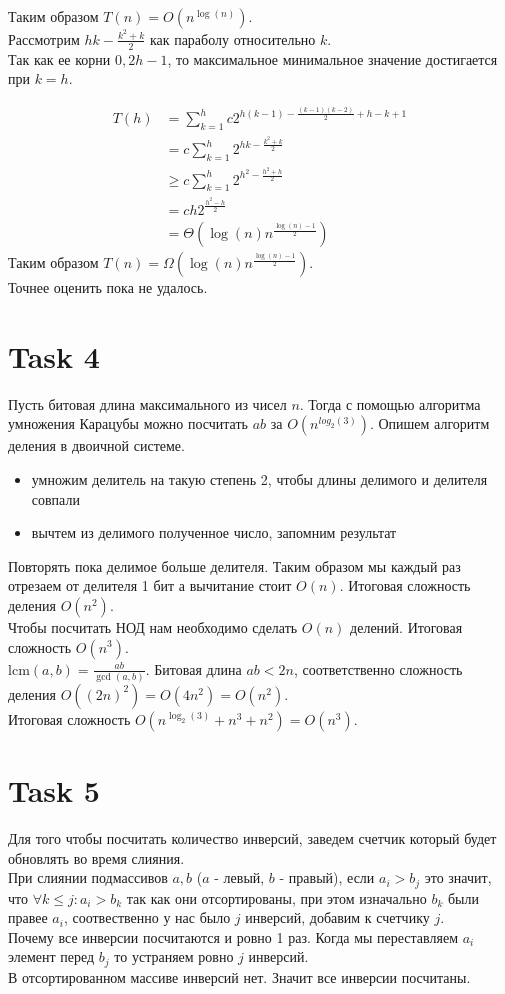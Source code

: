 \documentclass[12pt]{exam}
\begin{document}
Таким образом $T(n) = O(n^{\log(n)})$. \\
Рассмотрим $hk - \frac{k^2 + k}{2}$ как параболу относительно $k$. \\
Так как ее корни $0, 2h -1$, то максимальное минимальное значение достигается при $k=h$.

\begin{align*}
    T(h) &= \sum_{k = 1}^h c 2 ^ {h(k - 1) - \frac{(k - 1)(k - 2)}{2} + h - k + 1}  \\
         &= c \sum_{k = 1}^h 2 ^ {hk - \frac{k^2 + k}{2}} \\
         &\geq c \sum_{k = 1}^h 2 ^ {h^2 - \frac{h^2 + h}{2}} \\
         &= c h 2^{\frac{h^2 - h}{2}} \\
         &= \Theta(\log(n) n ^ {\frac{\log(n) - 1}{2}})
\end{align*}
Таким образом $T(n) = \Omega(\log(n) n ^ {\frac{\log(n) - 1}{2}})$. \\
Точнее оценить пока не удалось.

\section*{Task 4}
Пусть битовая длина максимального из чисел $n$. 
Тогда с помощью алгоритма умножения Карацубы можно посчитать $ab$ за $O(n^{log_2(3)})$.
Опишем алгоритм деления в двоичной системе.
\begin{itemize}
    \item умножим делитель на такую степень 2, чтобы длины делимого и делителя совпали
    \item вычтем из делимого полученное число, запомним результат
\end{itemize}
Повторять пока делимое больше делителя. Таким образом мы каждый раз отрезаем от делителя 1 бит а вычитание стоит $O(n)$. 
Итоговая сложность деления $O(n^2)$. \\
Чтобы посчитать НОД нам необходимо сделать $O(n)$ делений. Итоговая сложность $O(n^3)$.\\
$\mathrm{lcm}(a, b) = \frac{ab}{\gcd(a, b)}$. Битовая длина $ab < 2n$, соответственно сложность деления $O((2n)^2) = O(4n^2) = O(n^2)$. \\
Итоговая сложность $O(n^{\log_2(3)} + n^3 + n^2) = O(n^3)$. 

\section*{Task 5}
Для того чтобы посчитать количество инверсий, заведем счетчик который будет обновлять во время слияния.\\
При слиянии подмассивов $a, b$ ($a$ - левый, $b$ - правый), 
если $a_i > b_j$ это значит, что $\forall k \leq j: a_i > b_k$ так как они отсортированы, 
при этом изначально $b_k$ были правее $a_i$, соотвественно у нас было $j$ инверсий, 
добавим к счетчику $j$.  \\
Почему все инверсии посчитаются и ровно 1 раз. 
Когда мы переставляем $a_i$ элемент перед $b_j$ то устраняем ровно $j$ инверсий. \\
В отсортированном массиве инверсий нет. Значит все инверсии посчитаны.
\end{document}

